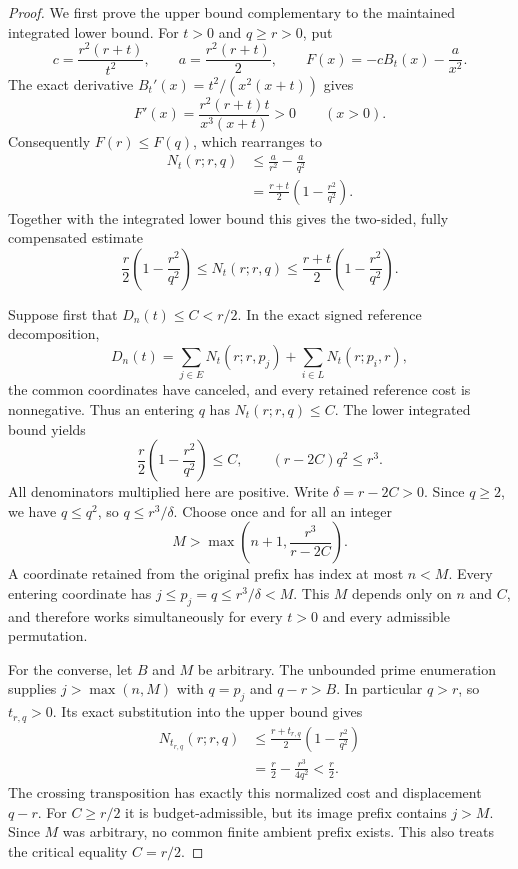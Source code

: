 \documentclass[11pt]{article}
\theoremstyle{definition}
\begin{document}
\begin{proof}
We first prove the upper bound complementary to the maintained
integrated lower bound. For $t>0$ and $q\ge r>0$, put
\[
 c=\frac{r^2(r+t)}{t^2},\qquad
 a=\frac{r^2(r+t)}2,\qquad
 F(x)=-cB_t(x)-\frac a{x^2}.
\]
The exact derivative $B_t'(x)=t^2/(x^2(x+t))$ gives
\[
 F'(x)=\frac{r^2(r+t)t}{x^3(x+t)}>0\qquad(x>0).
\]
Consequently $F(r)\le F(q)$, which rearranges to
\[
 \begin{split}
 N_t(r;r,q)
 &\le \frac a{r^2}-\frac a{q^2}\\
 &=\frac{r+t}{2}\left(1-\frac{r^2}{q^2}\right).
 \end{split}
\]
Together with the integrated lower bound this gives the
two-sided, fully compensated estimate
\[
 \frac r2\left(1-\frac{r^2}{q^2}\right)
 \le N_t(r;r,q)
 \le\frac{r+t}{2}\left(1-\frac{r^2}{q^2}\right).
\]

Suppose first that $D_n(t)\le C<r/2$.
In the exact signed reference decomposition,
\[
 D_n(t)=\sum_{j\in E}N_t(r;r,p_j)
             +\sum_{i\in L}N_t(r;p_i,r),
\]
the common coordinates have canceled, and every retained reference
cost is nonnegative. Thus an entering $q$ has
$N_t(r;r,q)\le C$. The lower integrated bound yields
\[
 \frac r2\left(1-\frac{r^2}{q^2}\right)\le C,
 \qquad (r-2C)q^2\le r^3.
\]
All denominators multiplied here are positive. Write
$\delta=r-2C>0$. Since $q\ge2$, we have $q\le q^2$, so
$q\le r^3/\delta$. Choose once and for all an integer
\[
 M>\max\left(n+1,\frac{r^3}{r-2C}\right).
\]
A coordinate retained from the original prefix has index at most
$n<M$. Every entering coordinate has
$j\le p_j=q\le r^3/\delta<M$. This $M$ depends only on $n$
and $C$, and therefore works simultaneously for every $t>0$
and every admissible permutation.

For the converse, let $B$ and $M$ be arbitrary. The unbounded
prime enumeration supplies $j>\max(n,M)$ with $q=p_j$ and
$q-r>B$. In particular $q>r$, so $t_{r,q}>0$. Its exact
substitution into the upper bound gives
\[
 \begin{split}
 N_{t_{r,q}}(r;r,q)
 &\le\frac{r+t_{r,q}}2\left(1-\frac{r^2}{q^2}\right)\\
 &=\frac r2-\frac{r^3}{4q^2}<\frac r2.
 \end{split}
\]
The crossing transposition has exactly this normalized cost and
displacement $q-r$. For $C\ge r/2$ it is budget-admissible,
but its image prefix contains $j>M$. Since $M$ was arbitrary,
no common finite ambient prefix exists. This also treats the
critical equality $C=r/2$.
\end{proof}
\end{document}

